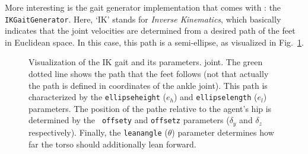 More interesting is the gait generator implementation that comes with
\libbats: the {\tt IKGaitGenerator}. Here, `IK' stands for
\emph{Inverse Kinematics}, which basically indicates that the joint
velocities are determined from a desired path of the feet in Euclidean
space. In this case, this path is a semi-ellipse, as visualized in
Fig.~\ref{fig:gait}.

\begin{figure}
  \centering
  \caption{Visualization of the IK gait and its parameters.
    joint. The green dotted line shows the path that the feet follows
    (not that actually the path is defined in coordinates of the ankle
    joint). This path is characterized by the {\tt ellipseheight}
    ($e_h$) and {\tt ellipselength} ($e_l$) parameters. The position
    of the pathe relative to the agent's hip is determined by the {\tt
      offsety} and {\tt offsetz} parameters ($\delta_y$ and $\delta_z$
    respectively). Finally, the {\tt leanangle} ($\theta$) parameter
    determines how far the torso should additionally lean
    forward. \label{fig:gait}}
\end{figure}


